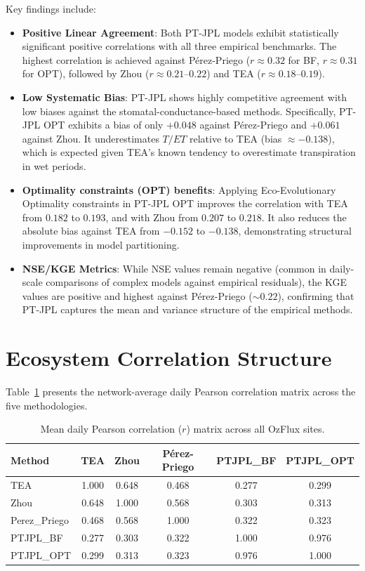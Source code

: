 \documentclass[11pt,a4paper]{article}
\begin{document}
Key findings include:
\begin{itemize}
  \item \textbf{Positive Linear Agreement}: Both PT-JPL models exhibit statistically significant positive correlations with all three empirical benchmarks. The highest correlation is achieved against Pérez-Priego ($r \approx 0.32$ for BF, $r \approx 0.31$ for OPT), followed by Zhou ($r \approx 0.21$--$0.22$) and TEA ($r \approx 0.18$--$0.19$).
  \item \textbf{Low Systematic Bias}: PT-JPL shows highly competitive agreement with low biases against the stomatal-conductance-based methods. Specifically, PT-JPL OPT exhibits a bias of only $+0.048$ against Pérez-Priego and $+0.061$ against Zhou. It underestimates $T/ET$ relative to TEA (bias $\approx -0.138$), which is expected given TEA's known tendency to overestimate transpiration in wet periods.
  \item \textbf{Optimality constraints (OPT) benefits}: Applying Eco-Evolutionary Optimality constraints in PT-JPL OPT improves the correlation with TEA from $0.182$ to $0.193$, and with Zhou from $0.207$ to $0.218$. It also reduces the absolute bias against TEA from $-0.152$ to $-0.138$, demonstrating structural improvements in model partitioning.
  \item \textbf{NSE/KGE Metrics}: While NSE values remain negative (common in daily-scale comparisons of complex models against empirical residuals), the KGE values are positive and highest against Pérez-Priego ($\sim 0.22$), confirming that PT-JPL captures the mean and variance structure of the empirical methods.
\end{itemize}

\section{Ecosystem Correlation Structure}
Table~\ref{tab:corr_matrix} presents the network-average daily Pearson correlation matrix across the five methodologies.

\begin{table}[H]
\centering
\caption{Mean daily Pearson correlation ($r$) matrix across all OzFlux sites.}
\label{tab:corr_matrix}
\begin{tabular}{lccccc}
\toprule
\textbf {Method} & \textbf{TEA} & \textbf{Zhou} & \textbf{Pérez-Priego} & \textbf{PTJPL\_BF} & \textbf{PTJPL\_OPT} \\
\midrule
  TEA & 1.000 & 0.648 & 0.468 & 0.277 & 0.299 \\
  Zhou & 0.648 & 1.000 & 0.568 & 0.303 & 0.313 \\
  Perez\_Priego & 0.468 & 0.568 & 1.000 & 0.322 & 0.323 \\
  PTJPL\_BF & 0.277 & 0.303 & 0.322 & 1.000 & 0.976 \\
  PTJPL\_OPT & 0.299 & 0.313 & 0.323 & 0.976 & 1.000 \\
\bottomrule
\end{tabular}
\end{table}
\end{document}

